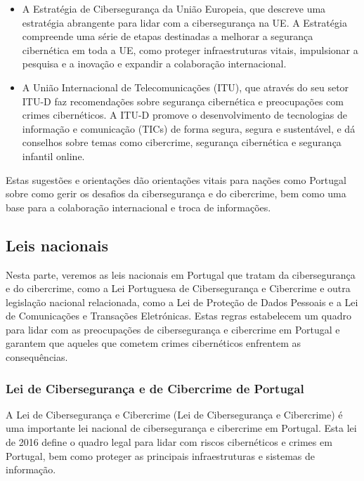 \begin{itemize}
  \item A Estratégia de Cibersegurança da União Europeia, que descreve uma estratégia abrangente para lidar com a cibersegurança na UE. A Estratégia compreende uma série de etapas destinadas a melhorar a segurança cibernética em toda a UE, como proteger infraestruturas vitais, impulsionar a pesquisa e a inovação e expandir a colaboração internacional.
  \item A União Internacional de Telecomunicações (ITU), que através do seu setor ITU-D faz recomendações sobre segurança cibernética e preocupações com crimes cibernéticos. A ITU-D promove o desenvolvimento de tecnologias de informação e comunicação (TICs) de forma segura, segura e sustentável, e dá conselhos sobre temas como cibercrime, segurança cibernética e segurança infantil online.
\end{itemize}

Estas sugestões e orientações dão orientações vitais para nações como Portugal sobre como gerir os desafios da cibersegurança e do cibercrime, bem como uma base para a colaboração internacional e troca de informações.

\subsection{Leis nacionais}

Nesta parte, veremos as leis nacionais em Portugal que tratam da cibersegurança e do cibercrime, como a Lei Portuguesa de Cibersegurança e Cibercrime e outra legislação nacional relacionada, como a Lei de Proteção de Dados Pessoais e a Lei de Comunicações e Transações Eletrónicas. Estas regras estabelecem um quadro para lidar com as preocupações de cibersegurança e cibercrime em Portugal e garantem que aqueles que cometem crimes cibernéticos enfrentem as consequências.

\subsubsection{Lei de Cibersegurança e de Cibercrime de Portugal}

A Lei de Cibersegurança e Cibercrime (Lei de Cibersegurança e Cibercrime) é uma importante lei nacional de cibersegurança e cibercrime em Portugal. Esta lei de 2016 define o quadro legal para lidar com riscos cibernéticos e crimes em Portugal, bem como proteger as principais infraestruturas e sistemas de informação.

